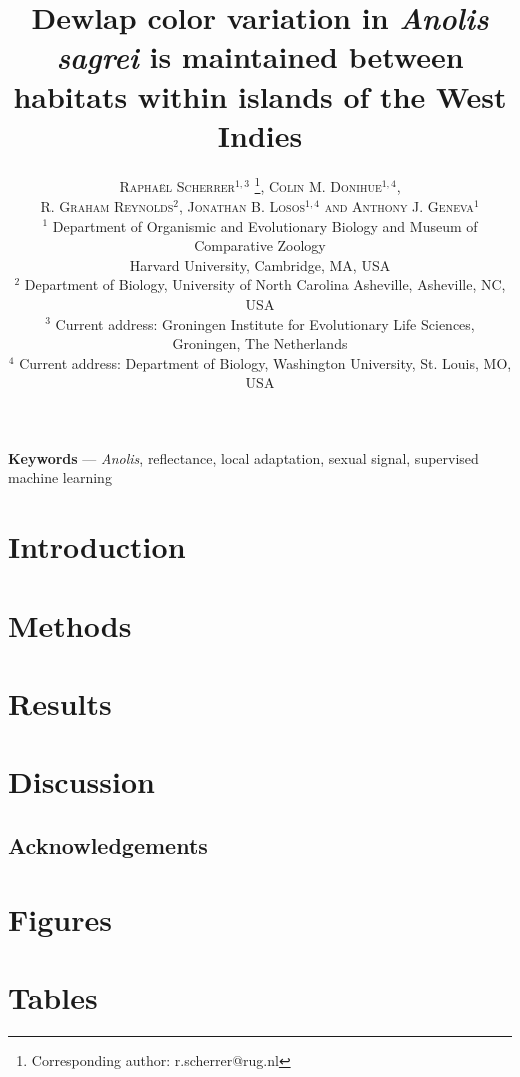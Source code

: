 \documentclass{article}
\title{Dewlap color variation in \textit{Anolis sagrei} is maintained between habitats within islands of the West Indies}
\author{
    \textsc{Rapha\"{e}l Scherrer$^{1,3}$ \thanks{Corresponding author: r.scherrer@rug.nl}, Colin M. Donihue$^{1,4}$, }\\
	\textsc{R. Graham Reynolds$^2$, Jonathan B. Losos$^{1,4}$ and Anthony J. Geneva$^1$} \\[1ex]
	\normalsize $^1$ Department of Organismic and Evolutionary Biology and Museum of Comparative Zoology \\ \normalsize Harvard University, Cambridge, MA, USA \\
	\normalsize $^2$ Department of Biology, University of North Carolina Asheville, Asheville, NC, USA\\ %
	\normalsize $^3$ Current address: Groningen Institute for Evolutionary Life Sciences,\\
	\normalsize Groningen, The Netherlands\\
	\normalsize $^4$ Current address: Department of Biology, Washington University, St. Louis, MO, USA\\
}
\date{} %
\begin{document}
	
\linenumbers
	
\maketitle

\begin{abstract}
    
\end{abstract}

\textbf{Keywords} --- \textit{Anolis}, reflectance, local adaptation, sexual signal, supervised machine learning

\section*{Introduction}
	

	
\section*{Methods}


	
\section*{Results}



\section*{Discussion}


	
\subsection*{Acknowledgements}


	
\pagebreak

\section*{Figures}



\pagebreak

\section*{Tables}
\end{document}
